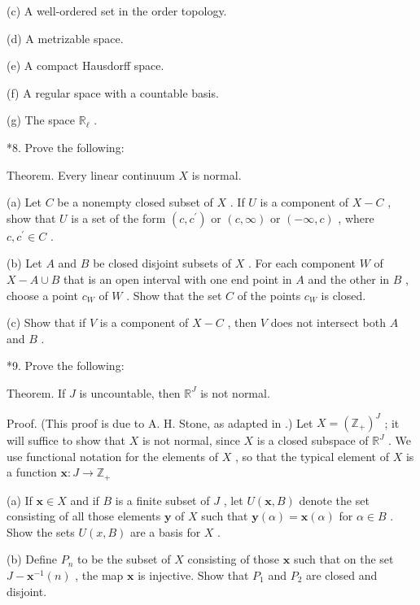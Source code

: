 (c) A well-ordered set in the order topology.

(d) A metrizable space.

(e) A compact Hausdorff space.

(f) A regular space with a countable basis.

(g) The space \({\mathbb{R}}_{\ell }\) .

*8. Prove the following:

Theorem. Every linear continuum \(X\) is normal.

(a) Let \(C\) be a nonempty closed subset of \(X\) . If \(U\) is a component of \(X - C\) , show that \(U\) is a set of the form \(\left( {c,{c}^{\prime }}\right)\) or \(\left( {c,\infty }\right)\) or \(\left( {-\infty ,c}\right)\) , where \(c,{c}^{\prime } \in  C\) .

(b) Let \(A\) and \(B\) be closed disjoint subsets of \(X\) . For each component \(W\) of \(X - A \cup  B\) that is an open interval with one end point in \(A\) and the other in \(B\) , choose a point \({c}_{W}\) of \(W\) . Show that the set \(C\) of the points \({c}_{W}\) is closed.

(c) Show that if \(V\) is a component of \(X - C\) , then \(V\) does not intersect both \(A\) and \(B\) .

*9. Prove the following:

Theorem. If \(J\) is uncountable, then \({\mathbb{R}}^{J}\) is not normal.

Proof. (This proof is due to A. H. Stone, as adapted in 		\cite{SteenSeebach1970}.) Let \(X = {\left( {\mathbb{Z}}_{ + }\right) }^{J}\) ; it will suffice to show that \(X\) is not normal, since \(X\) is a closed subspace of \({\mathbb{R}}^{J}\) . We use functional notation for the elements of \(X\) , so that the typical element of \(X\) is a function \(\mathbf{x} : J \rightarrow  {\mathbb{Z}}_{ + }\)

(a) If \(\mathbf{x} \in  X\) and if \(B\) is a finite subset of \(J\) , let \(U\left( {\mathbf{x},B}\right)\) denote the set consisting of all those elements \(\mathbf{y}\) of \(X\) such that \(\mathbf{y}\left( \alpha \right)  = \mathbf{x}\left( \alpha \right)\) for \(\alpha  \in  B\) . Show the sets \(U\left( {x,B}\right)\) are a basis for \(X\) .

(b) Define \({P}_{n}\) to be the subset of \(X\) consisting of those \(\mathbf{x}\) such that on the set \(J - {\mathbf{x}}^{-1}\left( n\right)\) , the map \(\mathbf{x}\) is injective. Show that \({P}_{1}\) and \({P}_{2}\) are closed and disjoint.

